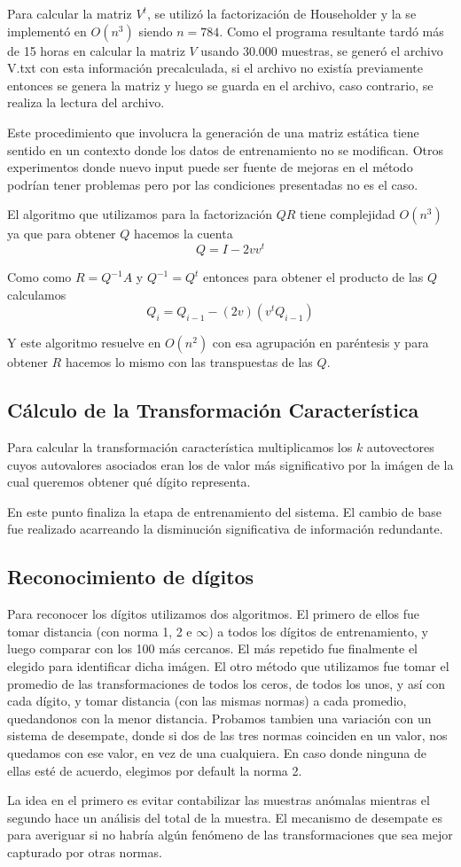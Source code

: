 Para calcular la matriz $V^t$, se utiliz\'o la factorizaci\'on de Householder y la se implement\'o en $O(n^3)$
siendo $n = 784$. Como el programa resultante tard\'o m\'as de 15 horas en calcular la matriz $V$ usando 30.000 muestras,
se gener\'o el archivo V.txt con esta informaci\'on precalculada, si el archivo no exist\'ia previamente
entonces se genera la matriz y luego se guarda en el archivo, caso contrario, se realiza la lectura del archivo.

Este procedimiento que involucra la generaci\'on de una matriz est\'atica tiene sentido en un contexto
donde los datos de entrenamiento no se modifican. Otros experimentos donde nuevo input puede ser fuente de mejoras
en el m\'etodo podr\'ian tener problemas pero por las condiciones presentadas no es el caso.

El algoritmo que utilizamos para la factorizaci\'on $QR$ tiene complejidad $O(n^3)$ ya que para obtener $Q$ hacemos la cuenta
$$Q = I - 2vv^t$$

Como como $R = Q^{-1}A$ y $Q^{-1} = Q^t$ entonces para obtener el producto de
las $Q$ calculamos
$$Q_i = Q_{i-1} - (2v)(v^t Q_{i-1})$$

Y este algoritmo resuelve en $O(n^2)$ con esa agrupaci\'on en par\'entesis y para
obtener $R$ hacemos lo mismo con las transpuestas de las $Q$.

\subsection{C\'alculo de la Transformaci\'on Caracter\'istica}

Para calcular la transformaci\'on caracter\'istica multiplicamos los $k$
autovectores cuyos autovalores asociados eran los de valor m\'as significativo
por la im\'agen de la cual queremos obtener qu\'e d\'igito representa.

En este punto finaliza la etapa de entrenamiento del sistema. El cambio de base
fue realizado acarreando la disminuci\'on significativa de informaci\'on
redundante.

\subsection{Reconocimiento de d\'igitos}
Para reconocer los d\'igitos utilizamos dos algoritmos. El primero de ellos fue tomar distancia (con norma 1, 2 e $\infty$) a
todos los d\'igitos de entrenamiento, y luego comparar con los 100 m\'as cercanos. El m\'as repetido fue finalmente
el elegido para identificar dicha im\'agen. El otro m\'etodo que utilizamos fue tomar el promedio de las transformaciones
de todos los ceros, de todos los unos, y as\'i con cada d\'igito, y tomar distancia (con las mismas normas)
a cada promedio, quedandonos con la menor distancia. Probamos tambien una variaci\'on con un sistema de desempate, donde si
dos de las tres normas coinciden en un valor, nos quedamos con ese valor, en vez de una cualquiera. En caso donde
ninguna de ellas est\'e de acuerdo, elegimos por default la norma 2.

La idea en el primero es evitar contabilizar las muestras an\'omalas mientras el
segundo hace un an\'alisis del total de la muestra. El mecanismo de desempate es para averiguar si no habr\'ia alg\'un fen\'omeno
de las transformaciones que sea mejor capturado por otras normas.


